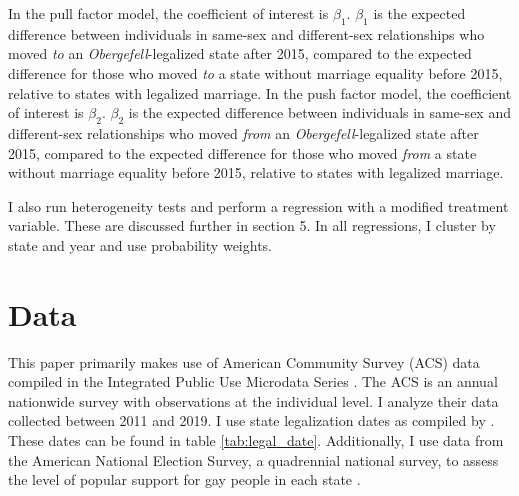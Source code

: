 \documentclass[12pt,letterpaper]{article}
\begin{document}
In the pull factor model, the coefficient of interest is $\beta_1$. $\beta_1$ is the expected difference between individuals in same-sex and different-sex relationships who moved \textit{to} an \textit{Obergefell}-legalized state after 2015, compared to the expected difference for those who moved \textit{to} a state without marriage equality before 2015, relative to states with legalized marriage. In the push factor model, the coefficient of interest is $\beta_2$. $\beta_2$ is the expected difference between individuals in same-sex and different-sex relationships who moved \textit{from} an \textit{Obergefell}-legalized state after 2015, compared to the expected difference for those who moved \textit{from} a state without marriage equality before 2015, relative to states with legalized marriage. 

I also run heterogeneity tests and perform a regression with a modified treatment variable. These are discussed further in section 5. In all regressions, I cluster by state and year and use probability weights. 

\section{Data}

This paper primarily makes use of American Community Survey (ACS) data compiled in the Integrated Public Use Microdata Series \citep{28}. The ACS is an annual nationwide survey with observations at the individual level. I analyze their data collected between 2011 and 2019. I use state legalization dates as compiled by \citet{27}. These dates can be found in table \ref{tab:legal_date}. Additionally, I use data from the American National Election Survey, a quadrennial national survey, to assess the level of popular support for gay people in each state \citep{29}.


\end{document}
